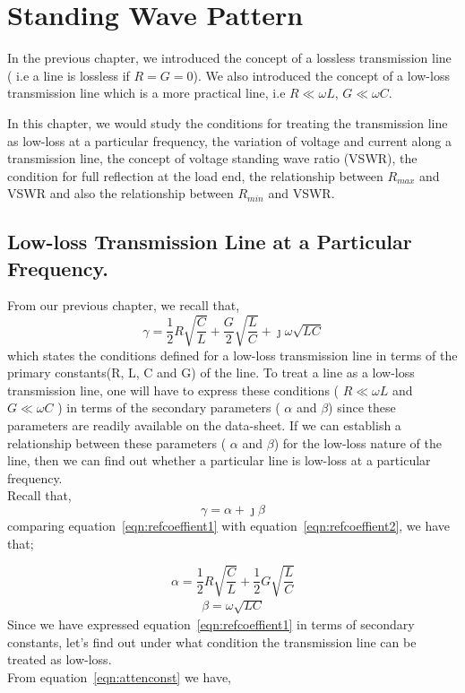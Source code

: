 \chapter{Standing Wave Pattern}\label{lec:lec5}
In the previous chapter, we introduced the concept of a lossless transmission line ( i.e a line is lossless if $R=G=0$). We also introduced the concept of a low-loss transmission line which is a more practical line, i.e $R \ll \omega L$, $G \ll \omega C $.

In this chapter, we would study the conditions for treating the transmission line as low-loss at a particular frequency, the variation of voltage and current along a transmission line, the concept of voltage standing wave ratio (VSWR), the condition for full reflection at the load end, the relationship between $R_{max}$ and VSWR and also the relationship between $R_{min}$ and VSWR.
\section{Low-loss Transmission Line at a Particular Frequency.}
From our previous chapter, we recall that,
\begin{equation}
\gamma = \frac{1}{2}R\sqrt{\frac{C}{L}} + \frac{G}{2}\sqrt{\frac{L}{C}} +\jmath\omega\sqrt{LC}
\label{eqn:refcoeffient1}
\end{equation}
which states the conditions defined for a low-loss transmission line in terms of the primary constants(R, L, C and G) of the line. To treat a line as a low-loss transmission line, one will have to express these conditions ( $R \ll \omega L$ and $G \ll \omega C$ ) in terms of the secondary parameters ( $\alpha$ and $\beta $) since these parameters are readily available on the data-sheet. If we can establish a relationship between these parameters ( $\alpha$ and $\beta $) for the low-loss nature of the line, then we can find out whether a particular line is low-loss at a particular frequency.\\
Recall that,
\begin{equation}
\gamma = \alpha + \jmath\beta
\label{eqn:refcoeffient2}
\end{equation}
comparing equation~\ref{eqn:refcoeffient1} with equation~\ref{eqn:refcoeffient2}, we have that;
 
\begin{equation}
\alpha = \frac{1}{2}R\sqrt{\frac{C}{L}} + \frac{1}{2}G\sqrt{\frac{L}{C}}	
\label{eqn:attenconst}
\end{equation}
\begin{align}
\beta = \omega\sqrt{LC}
\end{align}
Since we have expressed equation~\ref{eqn:refcoeffient1} in terms of secondary constants, let's find out under what condition the transmission line can be treated as low-loss.\\
From equation~\ref{eqn:attenconst} we have,


